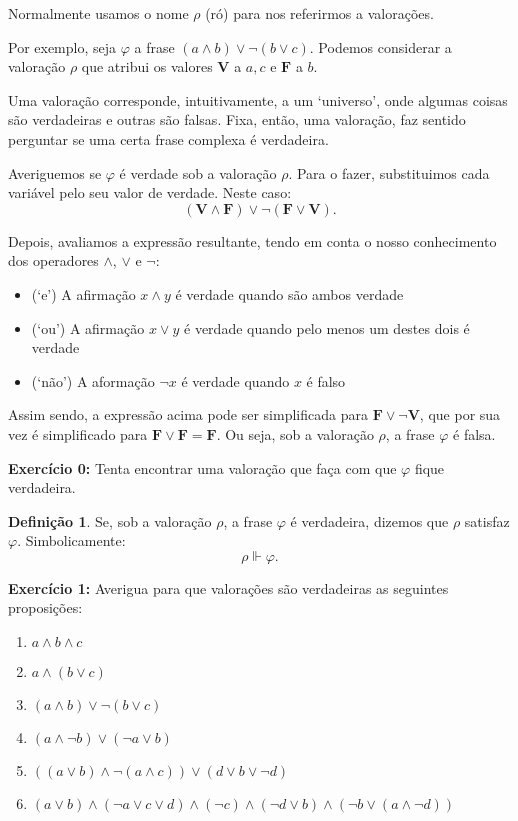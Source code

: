 \documentclass{article}
\theoremstyle{definition}
\newtheorem{definicao}{Definição}
\theoremstyle{remark}
\newcommand{\V}{\mathbf{V}}
\newcommand{\F}{\mathbf{F}}
\begin{document}
	Normalmente usamos o nome $\rho$ (ró) para nos referirmos a valorações.
	
	Por exemplo, seja $\varphi$ a frase $(a \land b) \lor \neg (b \lor c)$. Podemos considerar a valoração $\rho$ que atribui os valores $\V$ a $a, c$ e $\F$ a $b$.
	
	Uma valoração corresponde, intuitivamente, a um `universo', onde algumas coisas são verdadeiras e outras são falsas. Fixa, então, uma valoração, faz sentido perguntar se uma certa frase complexa é verdadeira.
	
	Averiguemos se $\varphi$ é verdade sob a valoração $\rho$. Para o fazer, substituimos cada variável pelo seu valor de verdade. Neste caso:
	\[(\V \land \F) \lor \neg (\F \lor \V).\]
	
	Depois, avaliamos a expressão resultante, tendo em conta o nosso conhecimento dos operadores $\land$, $\lor$ e $\neg$:
	
	\begin{itemize}
	\item (`e') A afirmação $x \land y$ é verdade quando são ambos verdade
	
	\item (`ou') A afirmação $x \lor y$ é verdade quando pelo menos um destes dois é verdade
	
	\item (`não') A aformação $\neg x$ é verdade quando $x$ é falso
	\end{itemize}
	
	Assim sendo, a expressão acima pode ser simplificada para $\F \lor \neg \V$, que por sua vez é simplificado para $\F \lor \F = \F$. Ou seja, sob a valoração $\rho$, a frase $\varphi$ é falsa.
	
	\textbf{Exercício 0:} Tenta encontrar uma valoração que faça com que $\varphi$ fique verdadeira.
	
	\begin{definicao}
	Se, sob a valoração $\rho$, a frase $\varphi$ é verdadeira, dizemos que $\rho$ satisfaz $\varphi$. Simbolicamente:
	\[\rho \Vdash \varphi.\]
	\end{definicao}
	
	\textbf{Exercício 1:} Averigua para que valorações são verdadeiras as seguintes proposições:
	
	\begin{enumerate}
	\item $a \land b \land c$
	
	\item $a \land (b \lor c)$
	
	\item $(a \land b) \lor \neg (b \lor c)$
	
	\item $(a \land \neg b) \lor (\neg a \lor b)$
	
	\item $((a \lor b) \land \neg (a \land c)) \lor (d \lor b \lor \neg d)$
	
	\item $(a \lor b) \land (\neg a \lor c \lor d) \land (\neg c) \land (\neg d \lor b) \land (\neg b \lor (a \land \neg d))$
	\end{enumerate}
	
\end{document}
